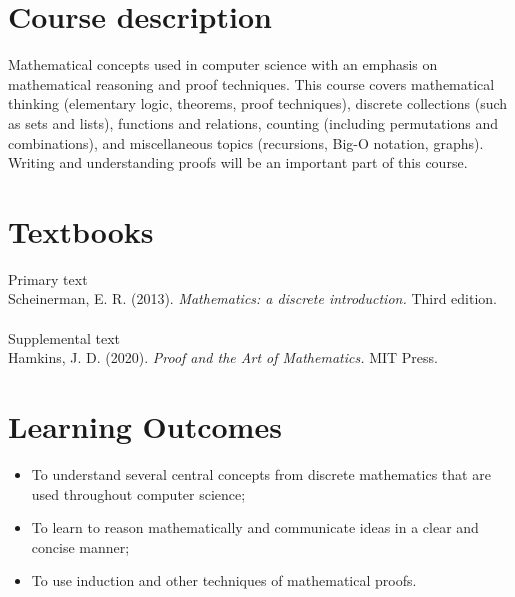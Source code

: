 \documentclass[letterpaper]{inzane_syllabus} %
\begin{document}
\makeprofile %


\section{Course description}

Mathematical concepts used in computer science with an emphasis on mathematical reasoning and proof techniques. This course covers mathematical thinking (elementary logic, theorems, proof techniques), discrete collections (such as sets and lists),  functions and relations,  counting (including permutations and combinations), and miscellaneous topics (recursions, Big-O notation, graphs).  Writing and understanding proofs will be an important part of this course.

\vspace{0.5cm} 
\section{Textbooks}

{\color{myCOLOR} Primary text}\\
Scheinerman, E. R. (2013). \textit{Mathematics: a discrete introduction.} Third edition.\\
\\
{\color{myCOLOR} Supplemental text}\\
Hamkins, J. D. (2020). \textit{Proof and the Art of Mathematics.}	 MIT Press.

\vspace{0.5cm}
\section{Learning Outcomes}

\begin{itemize}
\item To understand several central concepts from discrete mathematics that are used throughout computer science;
\item To learn to reason mathematically and communicate ideas in a clear and concise manner;
\item To use induction and other techniques of mathematical proofs.
\end{itemize}


\end{document}
